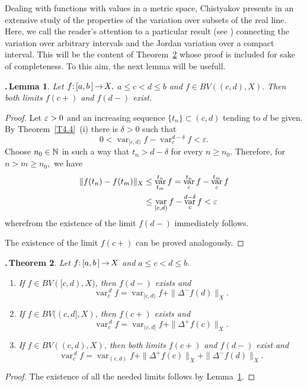 \documentclass[12pt,twoside]{article}
\numberwithin{equation}{section}
\theoremstyle{plain}
\newtheorem{theorem}{\hskip-1mm.\,Theorem}[section]
\newtheorem{lemma}[theorem]{\hskip-1mm.\,Lemma}
\theoremstyle{definition}
\DeclareMathOperator{\var}{var}
\begin{document}
{\smallskip

Dealing with functions with values in a metric space, Chistyakov presents in \cite{Ch}
an extensive study of the properties of the variation over subsets of the real line.
Here, we call the reader's attention to a particular result (see \cite[Corollary 4.7]{Ch})
connecting the variation over arbitrary intervals and the Jordan variation over a compact
interval. This will be the content of Theorem~\ref{vars} whose proof is included for sake
of completeness. To this aim, the next lemma will be usefull.

\smallskip

\begin{lemma}\label{limits}
Let $f{:}\,[a,b\,]\,{\to}\,X,$  $a\le c<d\le b$ and $f\in BV((c,d),X).$
Then both limits $f(c+)$ and $f(d-)$ exist.
\end{lemma}
\begin{proof}
Let $\varepsilon>0$ and an increasing sequence $\{t_n\}\subset (c,d)$ tending to $d$ be given.
By Theorem~\ref{T4.4}~(i) there is $\delta>0$ such that
\[
   0<\var_{[c,d)}f-\var_c^{d-\delta}f<\varepsilon.
\]
Choose $n_0\in{\mathbb N}$ in such a way that $t_n>d-\delta$ for every $n\ge n_0.$ Therefore,
for $n>m\ge n_0,$ we have
\begin{align*}
    \|f(t_n)-f(t_m)\|_{X}&\le\var_{t_m}^{t_n}f=\var_c^{t_n}f-\var_c^{t_m}f
  \\
    &\le\var_{[c,d)}f-\var_c^{d-\delta}f<\eps
\end{align*}
wherefrom the existence of the limit $f(d-)$ immediately follows.

The existence of the limit $f(c+)$ can be proved analogously.
\end{proof}

\smallskip

\begin{theorem}\label{vars}
Let $f{:}\,[a,b\,]\,{\to}\,X$ and $a\le c<d\le b.$
\begin{enumerate}[{\rm(i)}]
\item If $f\in BV([c,d),X)$, then $f(d-)$ exists and
\[
   \var_c^{\,d} f=\var_{[c,d)}f+\|\Delta^-f(d)\|_X.
\]
\item If $f\in BV((c,d],X)$, then $f(c+)$ exists and
\[
\var_c^{\,d} f=\var_{(c,d]}f+\|\Delta^+f(c)\|_X.
\]
\item If $f\in BV((c,d),X)$, then both limits $f(c+)$ and $f(d-)$ exist
and
\[
\var_c^{\,d} f=\var_{(c,d)}f+\|\Delta^+f(c)\|_X+\|\Delta^-f(d)\|_X.
\]
\end{enumerate}
\end{theorem}
\begin{proof}
The existence of all the needed limits follows by Lemma~\ref{limits}.


\end{proof}}
\end{document}

